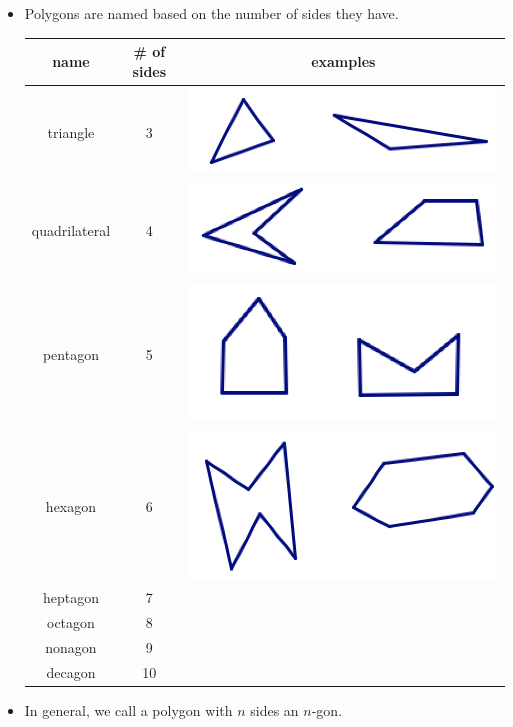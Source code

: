 \begin{itemize}
\item
Polygons are named based on the number of sides they have.
\begin{center}
\begin{tabular}{c | c | c}
{\bf name} & {\bf \# of sides} & {\bf examples}\\
\hline\hline
triangle & 3 & 
\includegraphics[scale=0.5]{triex} \\
\hline
quadrilateral & 4 & 
\includegraphics[scale=0.5]{quadex} \\
\hline
pentagon & 5 & 
\includegraphics[scale=0.5]{pentex} \\
\hline
hexagon & 6 &
\includegraphics[scale=0.5]{hexex} \\
\hline
heptagon & 7 &\\
octagon & 8 & \\
nonagon & 9 & \\
decagon & 10 & 
\end{tabular}

\end{center}

\bigskip

\item
In general, we call a polygon with $n$ sides an  $n$-gon.
\end{itemize}

